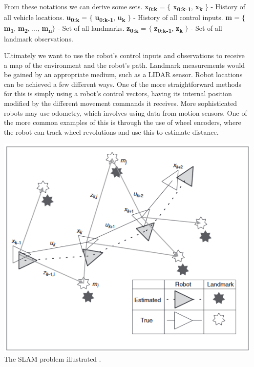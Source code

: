 				From these notations we can derive some sets. \newline
				\textbf{x\textsubscript{0:k}} = $\lbrace$ \textbf{x\textsubscript{0:k-1}}, \textbf{x\textsubscript{k}} $\rbrace$ - History of all vehicle locations. \newline
				\textbf{u\textsubscript{0:k}} = $\lbrace$ \textbf{u\textsubscript{0:k-1}}, \textbf{u\textsubscript{k}} $\rbrace$ - History of all control inputs. \newline
				\textbf{m} = $\lbrace$ \textbf{m\textsubscript{1}}, \textbf{m\textsubscript{2}}, ..., \textbf{m\textsubscript{n}}$\rbrace$ - Set of all landmarks. \newline
				\textbf{z\textsubscript{0:k}} = $\lbrace$ \textbf{z\textsubscript{0:k-1}}, \textbf{z\textsubscript{k}} $\rbrace$ - Set of all landmark observations. \newline
				
				Ultimately we want to use the robot's control inputs and observations to receive a map of the environment and the robot's path. Landmark measurements would be gained by an appropriate medium, such as a LIDAR sensor. Robot locations can be achieved a few different ways. One of the more straightforward methods for this is simply using a robot's control vectors, having its internal position modified by the different movement commands it receives. More sophisticated robots may use odometry, which involves using data from motion sensors. One of the more common examples of this is through the use of wheel encoders, where the robot can track wheel revolutions and use this to estimate distance.
			
				\includegraphics[scale=0.65]{ANALYSIS/slamdiagram.png} \newline
				The SLAM problem illustrated \citep{durrant2006simultaneous}.
			
